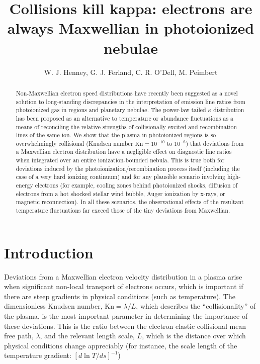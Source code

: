 \documentclass{emulateapj}
\newcommand\Kn{\ensuremath{\mathrm{Kn}}}
\newcommand\hii{\ion{H}{2}}
\begin{document}
\title{Collisions kill kappa: electrons are always Maxwellian in
  photoionized nebulae}

\author{W. J. Henney, G. J. Ferland, C. R. O'Dell, M. Peimbert}

\begin{abstract}
  Non-Maxwellian electron speed distributions have recently been
  suggested as a novel solution to long-standing discrepancies in the
  interpretation of emission line ratios from photoionized gas in
  \hii{} regions and planetary nebulae.  The power-law tailed
  \(\kappa\)
  distribution has been proposed as an alternative to temperature or
  abundance fluctuations as a means of reconciling the relative
  strengths of collisionally excited and recombination lines of the
  same ion.  We show that the plasma in photoionized regions is so
  overwhelmingly collisional (Knudsen number \(\Kn = 10^{-10}\)
  to \( 10^{-6}\))
  that deviations from a Maxwellian electron distribution have a
  negligible effect on diagnostic line ratios when integrated over an
  entire ionization-bounded nebula.  This is true both for deviations
  induced by the photoionization/recombination process itself
  (including the case of a very hard ionizing continuum) and for any
  plausible scenario involving high-energy electrons (for example,
  cooling zones behind photoionized shocks, diffusion of electrons
  from a hot shocked stellar wind bubble, Auger ionization by x-rays,
  or magnetic reconnection).  In all these scenarios, the
  observational effects of the resultant
  temperature fluctuations far exceed those of the tiny deviations
  from Maxwellian. 
\end{abstract}

\section{Introduction}
\label{sec:introduction}

Deviations from a Maxwellian electron velocity distribution in a
plasma arise when significant non-local transport of electrons occurs,
which is important if there are steep gradients in physical conditions
(such as temperature).  The dimensionless Knudsen number,
\(\Kn = \lambda / L\),
which describes the ``collisionality'' of the plasma, is the most
important parameter in determining the importance of these deviations.
This is the ratio between the electron elastic collisional mean free
path, \(\lambda\),
and the relevant length scale, \(L\),
which is the distance over which physical conditions change
appreciably (for instance, the scale length of the temperature
gradient: \([d \ln T / d s]^{-1}\))
\end{document}
